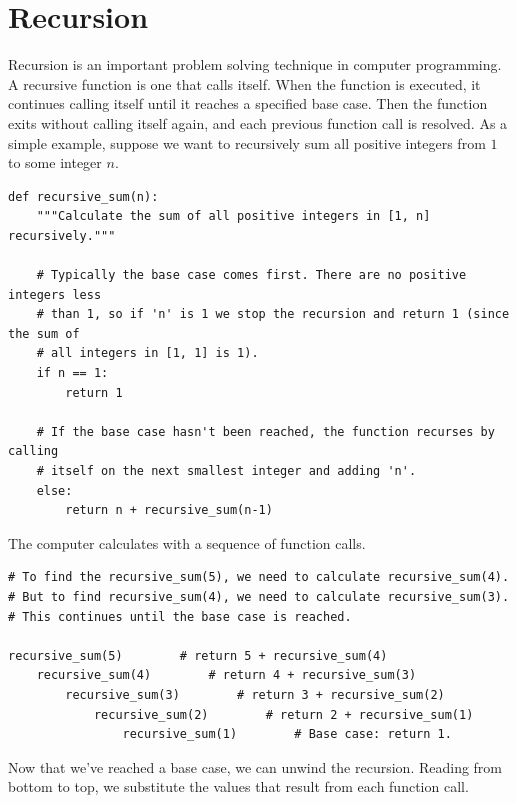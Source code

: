 \label{lab:Python_DataStructures2}


\section*{Recursion}

Recursion is an important problem solving technique in computer programming.
A recursive function is one that calls itself.
When the function is executed, it continues calling itself until it reaches a specified base case.
Then the function exits without calling itself again, and each previous function call is resolved.
As a simple example, suppose we want to recursively sum all positive integers from $1$ to some integer $n$.

\begin{lstlisting}
def recursive_sum(n):
	"""Calculate the sum of all positive integers in [1, n] recursively."""

	# Typically the base case comes first. There are no positive integers less
	# than 1, so if 'n' is 1 we stop the recursion and return 1 (since the sum of
	# all integers in [1, 1] is 1).
	if n == 1:
		return 1

	# If the base case hasn't been reached, the function recurses by calling
	# itself on the next smallest integer and adding 'n'.
	else:
		return n + recursive_sum(n-1)
\end{lstlisting}

The computer calculates  with a sequence of function calls.

\begin{lstlisting}
# To find the recursive_sum(5), we need to calculate recursive_sum(4).
# But to find recursive_sum(4), we need to calculate recursive_sum(3).
# This continues until the base case is reached.

recursive_sum(5)		# return 5 + recursive_sum(4)
	recursive_sum(4)		# return 4 + recursive_sum(3)
		recursive_sum(3)		# return 3 + recursive_sum(2)
			recursive_sum(2)		# return 2 + recursive_sum(1)
				recursive_sum(1)		# Base case: return 1.
\end{lstlisting}

Now that we've reached a base case, we can unwind the recursion.
Reading from bottom to top, we substitute the values that result from each function call.

